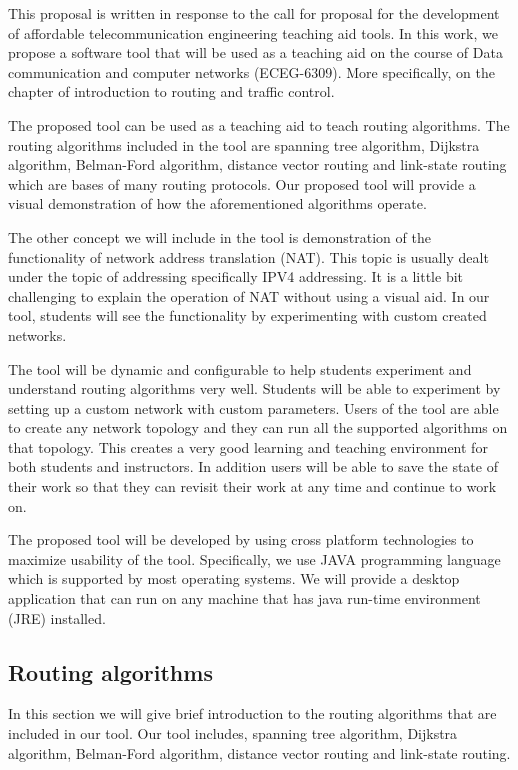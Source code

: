 This proposal is written in response to the call for proposal for the development of affordable telecommunication engineering teaching aid tools. In this work, we propose a software tool that will be used as a teaching aid on the course of Data communication and computer networks (ECEG-6309). More specifically, on the chapter of introduction to routing and traffic control. 

The proposed tool can be used as a teaching aid to teach routing algorithms. The routing algorithms included in the tool are spanning tree algorithm,  Dijkstra algorithm, Belman-Ford algorithm, distance vector routing and link-state routing which are  bases of many routing protocols. Our proposed tool will provide a visual demonstration of how the aforementioned algorithms operate. 

The other concept we will include in the tool is demonstration of the functionality of network address translation (NAT). This topic is usually dealt under  the topic of addressing specifically IPV4 addressing. It is a little bit challenging to explain the operation of NAT without using a visual aid. In our tool, students will see the functionality by experimenting with custom created networks. 

The tool will be dynamic and configurable to help students experiment and understand routing algorithms very well. Students will be able to experiment by setting up a custom network with custom parameters. Users of the tool are able to create any network topology and they can run all the supported algorithms on that topology. This creates a very good learning and teaching environment for both students and instructors. In addition users will be able to save the state of their work so that they can revisit their work at any time and continue to work on.  

The proposed tool will be developed by using cross platform technologies to maximize usability of the tool. Specifically, we use JAVA programming language which is supported by most operating systems. We will provide a desktop application that can run on any machine that has java  run-time environment (JRE) installed.  

\subsection{Routing algorithms}
 In this section we will give brief introduction to the routing algorithms that are included in our tool. Our tool includes, spanning tree algorithm,  Dijkstra algorithm, Belman-Ford algorithm, distance vector routing and link-state routing.
 
